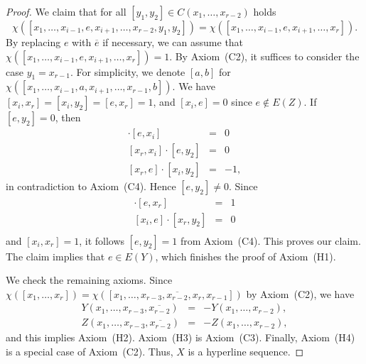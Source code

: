 \documentclass[a4paper]{amsart}
\theoremstyle{definition}
\theoremstyle{remark}
\begin{document}
\begin{proof}
  We claim that for all $[y_1,y_2]\in C(x_1,\dots,x_{r-2})$ holds
  $$\chi([x_1,\dots,x_{i-1},e,x_{i+1},\dots,x_{r-2},y_1,y_2]) =
   \chi([x_1,\dots,x_{i-1},e,x_{i+1},\dots,x_r]).$$
%
   By replacing $e$ with $\overline e$ if necessary, we can assume that
   $ \chi([x_1,\dots,x_{i-1},e,x_{i+1},\dots,x_r])=1$. 
   By Axiom~(C2), it suffices to consider the case $y_1=x_{r-1}$.  For
   simplicity, we denote $[a,b]$ for
   $\chi([x_1,\dots,x_{i-1},a,x_{i+1},\dots,x_{r-1},b])$.  We have
   $[x_i,x_r]=[x_i,y_2]=[e,x_r]=1$, and $[x_i,e]=0$
   since $e\not\in E(Z)$.
%
   If $[e,y_2]=0$, then
   \begin{eqnarray*}
     [x_r,y_2]\cdot [e,x_i] &=&0\\
     {}[x_r,x_i]\cdot [e,y_2] &=&0\\
     {}[x_r,e]\cdot [x_i,y_2] &=&-1, 
   \end{eqnarray*}
   in contradiction to Axiom~(C4). Hence $[e,y_2]\not=0$. Since
   \begin{eqnarray*}
     [x_i,y_2]\cdot [e,x_r] &=&1\\
     {}[x_i,e]\cdot [x_r,y_2] &=&0\\
   \end{eqnarray*}
   and $[x_i,x_r]=1$, it follows $[e,y_2]=1$ from Axiom~(C4).
   This proves our claim.
%
   The claim implies that $e\in E(Y)$, which finishes the proof of
   Axiom~(H1).

  We check the remaining axioms.  Since $\chi([x_1,\dots,x_r]) =
  \chi([x_1,\dots,x_{r-3},\overline{x_{r-2}}, x_r,x_{r-1}])$ by
  Axiom~(C2), we have
  \begin{eqnarray*}
    Y(x_1,\dots,x_{r-3},\overline{x_{r-2}}) &=& - Y(x_1,\dots,x_{r-2}),
    \\
    Z(x_1,\dots,x_{r-3},\overline{x_{r-2}}) &=& - Z(x_1,\dots,x_{r-2}),
  \end{eqnarray*}
  and this implies Axiom~(H2).
  Axiom~(H3) is Axiom~(C3). Finally, Axiom~(H4) is a special case of
  Axiom~(C2). Thus, $X$ is a hyperline sequence.
\end{proof}
\end{document}
